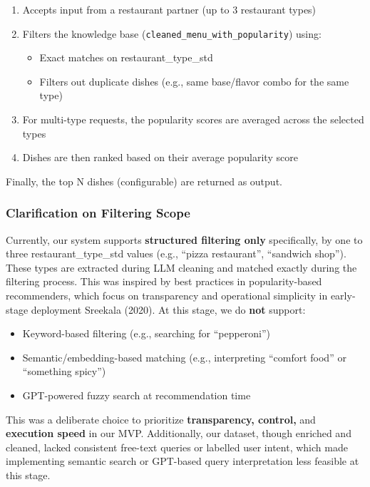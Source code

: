 \documentclass[
  11pt,
  a4paper,
  DIV=11,
  numbers=noendperiod]{scrartcl}
\providecommand{\tightlist}{%
  \setlength{\itemsep}{0pt}\setlength{\parskip}{0pt}}\usepackage{longtable,booktabs,array}
\begin{document}
\begin{enumerate}
\def\labelenumi{\arabic{enumi}.}
\tightlist
\item
  Accepts input from a restaurant partner (up to 3 restaurant types)
\item
  Filters the knowledge base (\texttt{cleaned\_menu\_with\_popularity})
  using:

  \begin{itemize}
  \tightlist
  \item
    Exact matches on restaurant\_type\_std
  \item
    Filters out duplicate dishes (e.g., same base/flavor combo for the
    same type)
  \end{itemize}
\item
  For multi-type requests, the popularity scores are averaged across the
  selected types
\item
  Dishes are then ranked based on their average popularity score
\end{enumerate}

Finally, the top N dishes (configurable) are returned as output.

\subsubsection{Clarification on Filtering
Scope}\label{clarification-on-filtering-scope}

Currently, our system supports \textbf{structured filtering only}
specifically, by one to three restaurant\_type\_std values (e.g.,
``pizza restaurant'', ``sandwich shop''). These types are extracted
during LLM cleaning and matched exactly during the filtering process.
This was inspired by best practices in popularity-based recommenders,
which focus on transparency and operational simplicity in early-stage
deployment Sreekala (2020). At this stage, we do \textbf{not} support:

\begin{itemize}
\tightlist
\item
  Keyword-based filtering (e.g., searching for ``pepperoni'')
\item
  Semantic/embedding-based matching (e.g., interpreting ``comfort food''
  or ``something spicy'')
\item
  GPT-powered fuzzy search at recommendation time
\end{itemize}

This was a deliberate choice to prioritize \textbf{transparency,
control,} and \textbf{execution speed} in our MVP. Additionally, our
dataset, though enriched and cleaned, lacked consistent free-text
queries or labelled user intent, which made implementing semantic search
or GPT-based query interpretation less feasible at this stage.
\end{document}
